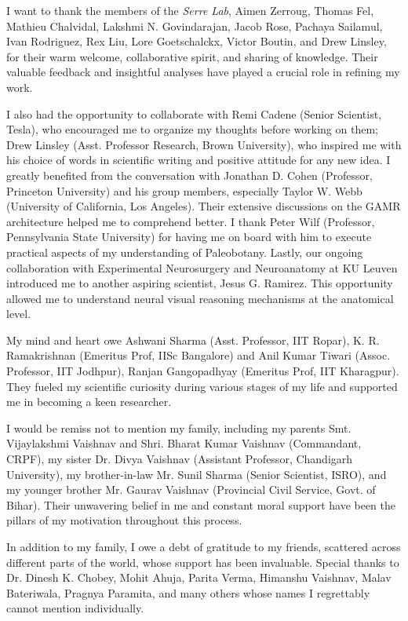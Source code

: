 I want to thank the members of the \textit{Serre Lab}, Aimen Zerroug, Thomas Fel, Mathieu Chalvidal, Lakshmi N. Govindarajan, Jacob Rose, Pachaya Sailamul, Ivan Rodriguez, Rex Liu, Lore Goetschalckx, Victor Boutin, and Drew Linsley, for their warm welcome, collaborative spirit, and sharing of knowledge. Their valuable feedback and insightful analyses have played a crucial role in refining my work.

I  also had the opportunity to collaborate with Remi Cadene (Senior Scientist, Tesla), who encouraged me to organize my thoughts before working on them; Drew Linsley (Asst. Professor Research, Brown University), who inspired me with his choice of words in scientific writing and positive attitude for any new idea. I greatly benefited from the conversation with Jonathan D. Cohen (Professor, Princeton University) and his group members, especially Taylor W. Webb (University of California, Los Angeles). Their extensive discussions on the GAMR architecture helped me to comprehend better. I thank Peter Wilf (Professor, Pennsylvania State University) for having me on board with him to execute practical aspects of my understanding of Paleobotany. Lastly, our ongoing collaboration with Experimental Neurosurgery and Neuroanatomy at KU Leuven introduced me to another aspiring scientist, Jesus G. Ramirez. This opportunity allowed me to understand neural visual reasoning mechanisms at the anatomical level.

My mind and heart owe Ashwani Sharma (Asst. Professor, IIT Ropar), K. R. Ramakrishnan (Emeritus Prof, IISc Bangalore) and Anil Kumar Tiwari (Assoc. Professor, IIT Jodhpur), Ranjan Gangopadhyay (Emeritus Prof, IIT Kharagpur). They fueled my scientific curiosity during various stages of my life and supported me in becoming a keen researcher.

I would be remiss not to mention my family, including my parents Smt. Vijaylakshmi Vaishnav and Shri. Bharat Kumar Vaishnav (Commandant, CRPF), my sister Dr. Divya Vaishnav (Assistant Professor, Chandigarh University), my brother-in-law Mr. Sunil Sharma (Senior Scientist, ISRO), and my younger brother Mr. Gaurav Vaishnav (Provincial Civil Service, Govt. of Bihar). Their unwavering belief in me and constant moral support have been the pillars of my motivation throughout this process. 

In addition to my family, I owe a debt of gratitude to my friends, scattered across different parts of the world, whose support has been invaluable. Special thanks to Dr. Dinesh K. Chobey, Mohit Ahuja, Parita Verma, Himanshu Vaishnav, Malav Bateriwala, Pragnya Paramita, and many others whose names I regrettably cannot mention individually. 
